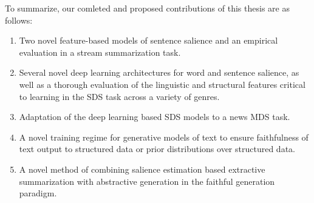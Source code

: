To summarize, our comleted and proposed contributions of this thesis are as 
follows:
\begin{enumerate}

 \item Two novel feature-based models of sentence salience and an empirical
    evaluation in a stream summarization task.


 \item Several novel deep learning architectures for word and sentence 
   salience, as well as a thorough evaluation of the linguistic and
   structural features critical to learning in the SDS task across a 
   variety of genres.

 \item Adaptation of the deep learning based SDS models to a news MDS task. 

 \item A novel training regime for generative models of text to ensure
          faithfulness of text output to structured data or 
         prior distributions over structured data.

 \item A novel method of combining salience estimation based extractive 
     summarization with abstractive generation in the faithful generation
    paradigm.    




\end{enumerate}




